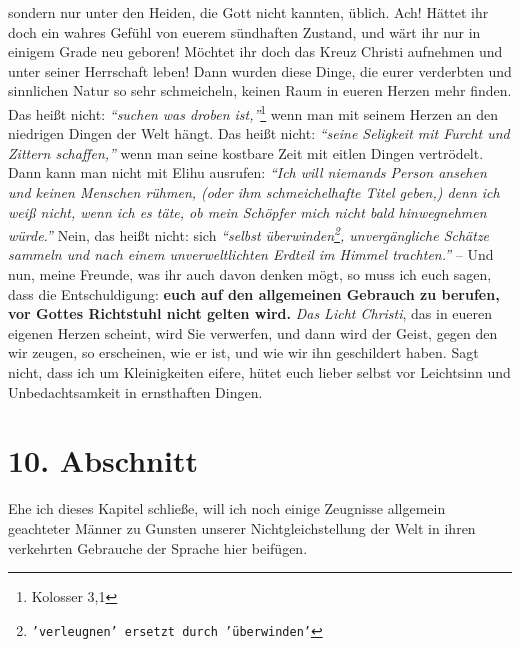 sondern nur unter den Heiden, die
Gott nicht kannten, üblich. Ach! Hättet ihr doch ein wahres Gefühl von euerem
sündhaften Zustand, und wärt ihr nur in einigem
Grade neu geboren! Möchtet ihr
doch das Kreuz Christi aufnehmen und unter seiner
Herrschaft leben! Dann wurden
diese Dinge, die eurer verderbten und sinnlichen
Natur so sehr schmeicheln,
keinen Raum in eueren Herzen mehr finden. Das heißt nicht:
\textit{"`suchen was droben ist,"'}\footnote{Kolosser 3,1}
wenn man mit seinem Herzen an den niedrigen Dingen der Welt hängt. Das
heißt nicht:
\textit{"`seine Seligkeit mit Furcht und Zittern schaffen,"'} wenn man
seine kostbare Zeit mit eitlen Dingen vertrödelt. Dann kann man nicht mit
Elihu
ausrufen:
\textit{"`Ich will niemands Person ansehen und keinen Menschen rühmen, (oder
ihm schmeichelhafte Titel geben,) denn ich weiß nicht, wenn ich es täte, ob
mein Schöpfer mich nicht bald hinwegnehmen würde."'}
Nein, das heißt nicht: sich
\textit{"`selbst überwinden\footnote{\texttt{'verleugnen' ersetzt durch
'überwinden'}}, unvergängliche
Schätze sammeln und nach einem
unverweltlichten Erdteil im Himmel trachten."'} -- Und nun, meine Freunde, was
ihr auch davon denken mögt, so muss ich euch sagen, dass die Entschuldigung:
\textbf{euch
auf den allgemeinen Gebrauch zu berufen, vor Gottes Richtstuhl nicht gelten
wird.} \textit{Das Licht Christi}, das in eueren eigenen Herzen
scheint, wird Sie
verwerfen, und dann wird der Geist, gegen den wir zeugen, so erscheinen, wie er
ist, und wie wir ihn geschildert haben. Sagt nicht, dass ich um Kleinigkeiten
eifere, hütet euch lieber selbst vor Leichtsinn und Unbedachtsamkeit in
ernsthaften Dingen.

\section{10. Abschnitt} \label{kap10_ab10}

Ehe ich dieses Kapitel schließe, will ich noch einige Zeugnisse allgemein
geachteter Männer zu Gunsten unserer Nichtgleichstellung der Welt in ihren
verkehrten Gebrauche der Sprache hier beifügen.

\medskip

